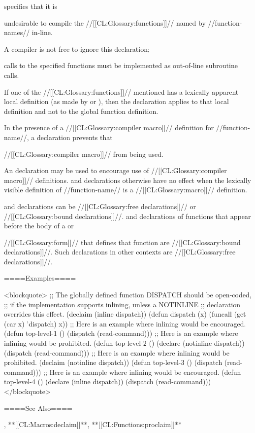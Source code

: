  specifies that it is

undesirable to compile the //[[CL:Glossary:functions]]// named by //function-names// in-line.

A compiler is not free to ignore this declaration;

calls to the specified functions must be implemented as out-of-line subroutine calls.

If one of the //[[CL:Glossary:functions]]// mentioned has a lexically apparent local definition (as made by  or ), then the declaration applies to that local definition and not to the global function definition.

In the presence of a //[[CL:Glossary:compiler macro]]// definition for //function-name//, a  declaration prevents that

//[[CL:Glossary:compiler macro]]// from being used.

An  declaration may be used to encourage use of //[[CL:Glossary:compiler macro]]// definitions.  and  declarations otherwise have no effect when the lexically visible definition of //function-name// is a //[[CL:Glossary:macro]]// definition.

 and  declarations can be //[[CL:Glossary:free declarations]]// or //[[CL:Glossary:bound declarations]]//.  and  declarations of functions that appear before the body of a  or 

//[[CL:Glossary:form]]// that defines that function are //[[CL:Glossary:bound declarations]]//. Such declarations in other contexts are //[[CL:Glossary:free declarations]]//.

====Examples====

<blockquote> ;; The globally defined function DISPATCH should be open-coded, ;; if the implementation supports inlining, unless a NOTINLINE ;; declaration overrides this effect. (declaim (inline dispatch)) (defun dispatch (x) (funcall (get (car x) 'dispatch) x)) ;; Here is an example where inlining would be encouraged. (defun top-level-1 () (dispatch (read-command))) ;; Here is an example where inlining would be prohibited. (defun top-level-2 () (declare (notinline dispatch)) (dispatch (read-command))) ;; Here is an example where inlining would be prohibited. (declaim (notinline dispatch)) (defun top-level-3 () (dispatch (read-command))) ;; Here is an example where inlining would be encouraged. (defun top-level-4 () (declare (inline dispatch)) (dispatch (read-command))) </blockquote>

====See Also====

, **[[CL:Macros:declaim]]**, **[[CL:Functions:proclaim]]**

      
